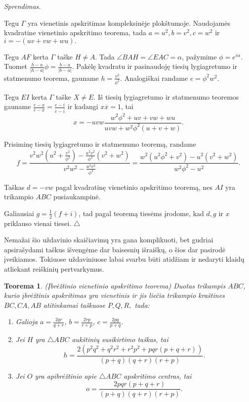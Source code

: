 \documentclass[11pt,a4paper,twoside]{book}
\newenvironment{sprendimas}{\noindent \textit{Sprendimas.}}{\hfill $\triangle$}
\newtheorem{thmnr}{Teorema}
\theoremstyle{definition} \newtheorem*{api}{Apibrėžimas}
\theoremstyle{remark} \newtheorem*{pastaba}{Pastaba}
\begin{document}
\begin{sprendimas}

Tegu $\Gamma$ yra vienetinis apskritimas kompleksinėje plokštumoje. Naudojamės kvadratine vienetinio apskritimo teorema, tada $a=u^2, b=v^2, c=w^2$ ir $i = -(uv+vw+wu).$

Tegu $AF$ kerta $\Gamma$ taške $H\ne A$. Tada $\angle BAH =\angle EAC =\alpha$, pažymime $\phi=e^{i\alpha}$. Tuomet $\frac{h-a}{|h-a|}\phi=\frac{b-a}{|b-a|}.$ Pakėlę kvadratu ir pasinaudoję tiesių lygiagretumo ir statmenumo teorema, gauname $h=\frac{v^2}{\phi^2}$. Analogiškai randame $e=\phi^2w^2$.

Tegu $EI$ kerta $\Gamma$ taške $X \ne E$. Iš tiesių lygiagretumo ir statmenumo teoremos gauname $\frac{e-x}{\overline{e}-\overline{x}}=\frac{e-i}{\overline{e}-\overline{i}}$ ir kadangi $x\overline{x}=1$, tai 
$$x=-uvw\frac{w^2\phi ^2 +uv+vw+wu}{uvw +w^2\phi ^2(u+v+w)}.$$

Prisiminę tiesių lygiagretumo ir statmenumo teoremą, randame 
$$f=\frac{v^2w^2(u^2 + \frac{v^2}{\phi ^2}) - \frac{u^2v^2}{\phi ^2}(v^2+w^2)}{v^2w^2 - \frac{u^2v^2}{\phi ^2}}=\frac{w^2(u^2\phi^2 + v^2) - u^2(v^2+w^2)}{w^2\phi^2 - u^2}.$$

Taškas $d=-vw$ pagal kvadratinę vienetinio apskritimo teoremą, nes $AI$ yra trikampio $ABC$ pusiaukampinė.

Galiausiai $g=\frac{1}{2}(f+i)$, tad pagal teoremą tiesėms įrodome, kad $d, g$ ir $x$ priklauso vienai tiesei.
\end{sprendimas}

Nemažai šio uždavinio skaičiavimų yra gana komplikuoti, bet gudriai apsirašydami taškus išvengėme dar baisesnių išraiškų, o šios dar pasirodė įveikiamos. Tokiuose uždaviniuose labai svarbu būti atidžiam ir nedaryti klaidų atliekant reiškinių pertvarkymus.













\begin{thmnr} \textit{(Įbrėžtinio vienetinio apskritimo teorema)} Duotas trikampis $ABC$, kurio įbrėžtinis apskritimas yra vienetinis ir jis liečia trikampio kraštines $BC, CA, AB$ atitinkamai taškuose $P, Q, R,$ tada:
\begin{enumerate}
\item Galioja $a=\frac{2qr}{q+r}$, $b=\frac{2rp}{r+p}$, $c=\frac{2pq}{p+q}$.
\item Jei $H$ yra $\bigtriangleup ABC$ aukštinių susikirtimo taškas, tai
$$h=\frac{2(p^2q^2 + q^2r^2 + r^2p^2 + pqr(p + q+ r))}{(p+q)(q+r)(r+p)}.$$
\item Jei $O$ yra apibrėžtinio apie  $\bigtriangleup ABC$ apskritimo centras, tai
$$o=\frac{2pqr(p+q+r)}{(p+q)(q+r)(r+p)}.$$
\end{enumerate}
\end{thmnr}
\end{document}
